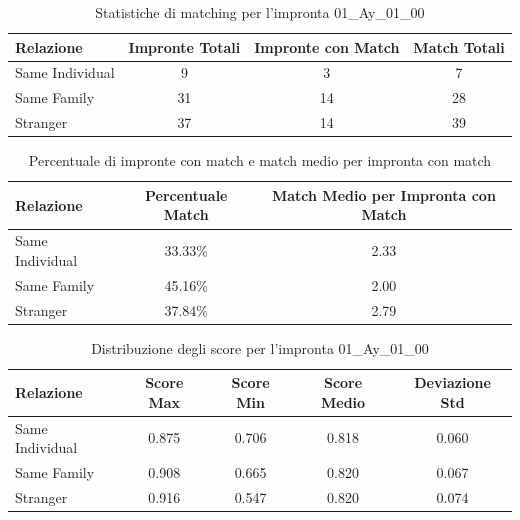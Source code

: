 \begin{table}[htbp]
\centering
\caption{Statistiche di matching per l'impronta 01\_Ay\_01\_00}
\label{tab:results_01_Ay_01_00}
\begin{tabular}{|l|c|c|c|}
\hline
\textbf{Relazione} & \textbf{Impronte Totali} & \textbf{Impronte con Match} & \textbf{Match Totali} \\
\hline
Same Individual & 9 & 3 & 7 \\
\hline
Same Family & 31 & 14 & 28 \\
\hline
Stranger & 37 & 14 & 39 \\
\hline
\end{tabular}
\end{table}


\begin{table}[htbp]
\centering
\caption{Percentuale di impronte con match e match medio per impronta con match}
\label{tab:match_percentage_01_Ay_01_00}
\begin{tabular}{|l|c|c|}
\hline
\textbf{Relazione} & \textbf{Percentuale Match} & \textbf{Match Medio per Impronta con Match} \\
\hline
Same Individual & 33.33\% & 2.33 \\
\hline
Same Family & 45.16\% & 2.00 \\
\hline
Stranger & 37.84\% & 2.79 \\
\hline
\end{tabular}
\end{table}


\begin{table}[htbp]
\centering
\caption{Distribuzione degli score per l'impronta 01\_Ay\_01\_00}
\label{tab:scores_01_Ay_01_00}
\begin{tabular}{|l|c|c|c|c|}
\hline
\textbf{Relazione} & \textbf{Score Max} & \textbf{Score Min} & \textbf{Score Medio} & \textbf{Deviazione Std} \\
\hline
Same Individual & 0.875 & 0.706 & 0.818 & 0.060 \\
\hline
Same Family & 0.908 & 0.665 & 0.820 & 0.067 \\
\hline
Stranger & 0.916 & 0.547 & 0.820 & 0.074 \\
\hline
\end{tabular}
\end{table}

